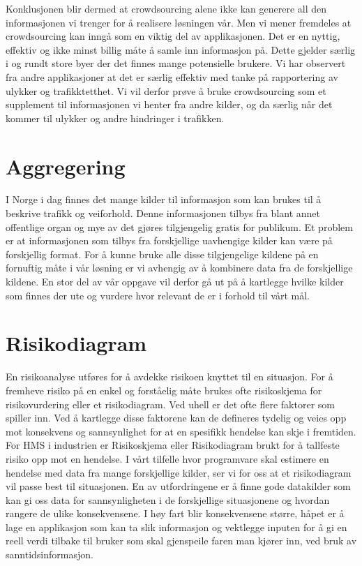 \documentclass[a4paper,norsk,oneside]{book}
\begin{document}
Konklusjonen blir dermed at crowdsourcing alene ikke kan generere all den informasjonen vi trenger for å realisere løsningen vår. Men vi mener fremdeles at crowdsourcing kan inngå som en viktig del av applikasjonen. Det er en nyttig, effektiv og ikke minst billig måte å samle inn informasjon på. Dette gjelder særlig i og rundt store byer der det finnes mange potensielle brukere. Vi har observert fra andre applikasjoner at det er særlig effektiv med tanke på rapportering av ulykker og trafikktetthet. Vi vil derfor prøve å bruke crowdsourcing som et supplement til informasjonen vi henter fra andre kilder, og da særlig når det kommer til ulykker og andre hindringer i trafikken.


\section{Aggregering}
\label{sec:Aggregering}

I Norge i dag finnes det mange kilder til informasjon som kan brukes til å beskrive trafikk og veiforhold. Denne informasjonen tilbys fra blant annet offentlige organ og mye av det gjøres tilgjengelig gratis for publikum. Et problem er at informasjonen som tilbys fra forskjellige uavhengige kilder kan være på forskjellig format. For å kunne bruke alle disse tilgjengelige kildene på en fornuftig måte i vår løsning er vi avhengig av å kombinere data fra de forskjellige kildene. En stor del av vår oppgave vil derfor gå ut på å kartlegge hvilke kilder som finnes der ute og vurdere hvor relevant de er i forhold til vårt mål.

\section{Risikodiagram}
\label{sec:risikodiagram}

En risikoanalyse utføres for å avdekke risikoen knyttet til en situasjon. For å fremheve risiko på en enkel og forståelig måte brukes ofte risikoskjema for risikovurdering eller et risikodiagram. Ved uhell er det ofte flere faktorer som spiller inn. Ved å kartlegge disse faktorene kan de defineres tydelig og veies opp mot konsekvens og sannsynlighet for at en spesifikk hendelse kan skje i fremtiden. For HMS i industrien er Risikoskjema eller Risikodiagram brukt for å tallfeste risiko opp mot en hendelse. I vårt tilfelle hvor programvare skal estimere en hendelse med data fra mange forskjellige kilder, ser vi for oss at et risikodiagram vil passe best til situasjonen. En av utfordringene er å finne gode datakilder som kan gi oss data for sannsynligheten i de forskjellige situasjonene og hvordan rangere de ulike konsekvensene. I høy fart blir konsekvensene større, håpet er å lage en applikasjon som kan ta slik informasjon og vektlegge inputen for å gi en reell verdi tilbake til bruker som skal gjenspeile faren man kjører inn, ved bruk av sanntidsinformasjon.
\end{document}
